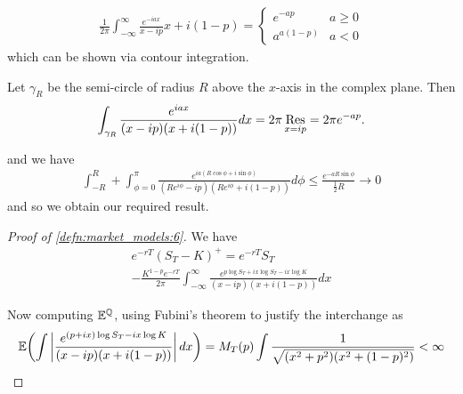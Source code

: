 \begin{lem}
  \begin{align}
    \label{eq:118}
    \frac{1}{2\pi} \int_{-\infty}^{\infty} \frac{e^{-iax}}{x-ip}{x +
      i(1-p)} =
    \begin{cases}
      e^{-ap} & a \geq 0 \\
      a^{a(1-p)} & a < 0
    \end{cases}
  \end{align}
  which can be shown via contour integration.

  Let $\gamma_{R}$ be the semi-circle of radius $R$ above the $x$-axis
  in the complex plane. Then
  \begin{align}
    \label{eq:119}
    \int_{\gamma_{R}} \frac{e^{iax}}{(x-ip)(x+i(1-p))} dx = 2\pi
    \operatorname*{Res}_{x=ip} = 2\pi e^{-ap}.
  \end{align}

  and we have
  \begin{align}
    \label{eq:120}
    \int_{-R}^{R} + \int_{\phi=0}^{\pi} \frac{e^{ia(R \cos \phi + i
        \sin \phi)}}{(Re^{i \phi} - ip)(Re^{i \phi} + i(1-p))} d\phi
    \leq \frac{e^{-aR\sin \phi}}{\frac{1}{2}R} \rightarrow 0
  \end{align} and so we obtain our required result.
\end{lem}

\begin{proof}[Proof of \ref{defn:market_models:6}]
  We have
  \begin{multline}
    \label{eq:121}
    e^{-rT}(S_{T} - K)^{+} = e^{-rT} S_{T} \\ - \frac{K^{1-p}
      e^{-rT}}{2\pi} \int_{-\infty}^{\infty} \frac{e^{p\log S_{T} +
        ix\log S_{T} - ix \log K}}{(x - ip)(x + i(1-p))} dx 
  \end{multline}

  Now computing $\mathbb{E}^{\Q}$, using Fubini's theorem to justify
  the interchange as
  \begin{align}
    \label{eq:122}
    \E{\int \left| \frac{e^{(p + ix) \log S_{T} - ix \log K}}{(x - ip)(x +
        i(1-p))}\right| dx}  = M_{T}(p) \int \frac{1}{\sqrt{(x^{2} +
        p^{2})(x^{2} + (1 - p)^{2})}} < \infty
  \end{align}
\end{proof}

